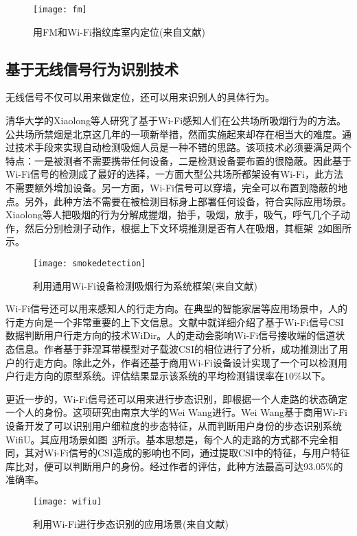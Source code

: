 \begin{figure}[htbp] %
  \centering
  \texttt{[image: fm]}
  \caption[用FM和Wi-Fi指纹库室内定位]{用FM和Wi-Fi指纹库室内定位(来自文献)}
  \label{fig:fm}
\end{figure}


\subsection{基于无线信号行为识别技术}
无线信号不仅可以用来做定位，还可以用来识别人的具体行为。

清华大学的Xiaolong等人研究了基于Wi-Fi感知人们在公共场所吸烟行为的方法。公共场所禁烟是北京这几年的一项新举措，然而实施起来却存在相当大的难度。通过技术手段来实现自动检测吸烟人员是一种不错的思路。该项技术必须要满足两个特点：一是被测者不需要携带任何设备，二是检测设备要布置的很隐蔽。因此基于Wi-Fi信号的检测成了最好的选择，一方面大型公共场所都架设有Wi-Fi，此方法不需要额外增加设备。另一方面，Wi-Fi信号可以穿墙，完全可以布置到隐蔽的地点。另外，此种方法不需要在被检测目标身上部署任何设备，符合实际应用场景。Xiaolong等人把吸烟的行为分解成握烟，抬手，吸烟，放手，吸气，呼气几个子动作，然后分别检测子动作，根据上下文环境推测是否有人在吸烟，其框架~\ref{fig:smokedetection}如图所示。

\begin{figure}[htbp] %
  \centering
  \texttt{[image: smokedetection]}
  \caption[利用通用Wi-Fi设备检测吸烟行为系统框架]{利用通用Wi-Fi设备检测吸烟行为系统框架(来自文献)}
  \label{fig:smokedetection}
\end{figure}

Wi-Fi信号还可以用来感知人的行走方向。在典型的智能家居等应用场景中，人的行走方向是一个非常重要的上下文信息。文献\cite{wu2016widir}中就详细介绍了基于Wi-Fi信号CSI数据判断用户行走方向的技术WiDir。人的走动会影响Wi-Fi信号接收端的信道状态信息。作者基于菲涅耳带模型对子载波CSI的相位进行了分析，成功推测出了用户的行走方向。除此之外，作者还基于商用Wi-Fi设备设计实现了一个可以检测用户行走方向的原型系统。评估结果显示该系统的平均检测错误率在10\%以下。

更近一步的，Wi-Fi信号还可以用来进行步态识别，即根据一个人走路的状态确定一个人的身份。这项研究由南京大学的Wei Wang进行。Wei Wang基于商用Wi-Fi设备开发了可以识别用户细粒度的步态特征，从而判断用户身份的步态识别系统WifiU。其应用场景如图~\ref{fig:wifiu}所示。基本思想是，每个人的走路的方式都不完全相同，其对Wi-Fi信号的CSI造成的影响也不同，通过提取CSI中的特征，与用户特征库比对，便可以判断用户的身份。经过作者的评估，此种方法最高可达93.05\%的准确率。
\begin{figure}[htbp] %
  \centering
  \texttt{[image: wifiu]}
  \caption[利用Wi-Fi进行步态识别的应用场景]{利用Wi-Fi进行步态识别的应用场景(来自文献)}
  \label{fig:wifiu}
\end{figure}



